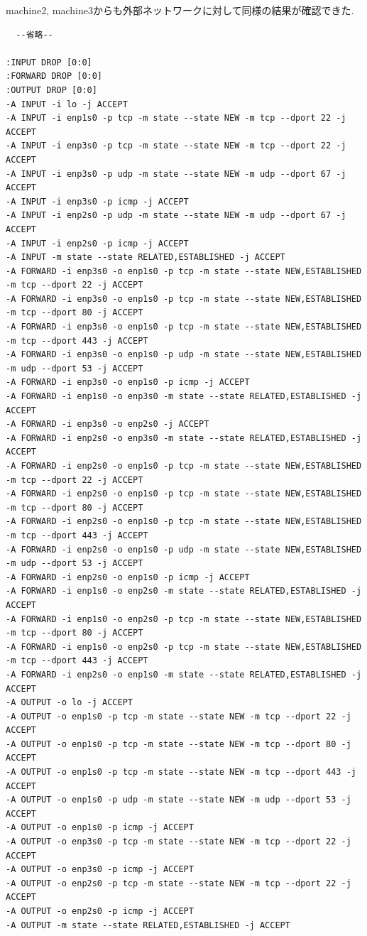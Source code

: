 \documentclass{ltjsarticle} %
\begin{document}
machine2, machine3からも外部ネットワークに対して同様の結果が確認できた. 

\begin{mdframed}
  \begin{verbatim}
  --省略--

:INPUT DROP [0:0]
:FORWARD DROP [0:0]
:OUTPUT DROP [0:0]
-A INPUT -i lo -j ACCEPT
-A INPUT -i enp1s0 -p tcp -m state --state NEW -m tcp --dport 22 -j ACCEPT
-A INPUT -i enp3s0 -p tcp -m state --state NEW -m tcp --dport 22 -j ACCEPT
-A INPUT -i enp3s0 -p udp -m state --state NEW -m udp --dport 67 -j ACCEPT
-A INPUT -i enp3s0 -p icmp -j ACCEPT
-A INPUT -i enp2s0 -p udp -m state --state NEW -m udp --dport 67 -j ACCEPT
-A INPUT -i enp2s0 -p icmp -j ACCEPT
-A INPUT -m state --state RELATED,ESTABLISHED -j ACCEPT
-A FORWARD -i enp3s0 -o enp1s0 -p tcp -m state --state NEW,ESTABLISHED -m tcp --dport 22 -j ACCEPT
-A FORWARD -i enp3s0 -o enp1s0 -p tcp -m state --state NEW,ESTABLISHED -m tcp --dport 80 -j ACCEPT
-A FORWARD -i enp3s0 -o enp1s0 -p tcp -m state --state NEW,ESTABLISHED -m tcp --dport 443 -j ACCEPT
-A FORWARD -i enp3s0 -o enp1s0 -p udp -m state --state NEW,ESTABLISHED -m udp --dport 53 -j ACCEPT
-A FORWARD -i enp3s0 -o enp1s0 -p icmp -j ACCEPT
-A FORWARD -i enp1s0 -o enp3s0 -m state --state RELATED,ESTABLISHED -j ACCEPT
-A FORWARD -i enp3s0 -o enp2s0 -j ACCEPT
-A FORWARD -i enp2s0 -o enp3s0 -m state --state RELATED,ESTABLISHED -j ACCEPT
-A FORWARD -i enp2s0 -o enp1s0 -p tcp -m state --state NEW,ESTABLISHED -m tcp --dport 22 -j ACCEPT
-A FORWARD -i enp2s0 -o enp1s0 -p tcp -m state --state NEW,ESTABLISHED -m tcp --dport 80 -j ACCEPT
-A FORWARD -i enp2s0 -o enp1s0 -p tcp -m state --state NEW,ESTABLISHED -m tcp --dport 443 -j ACCEPT
-A FORWARD -i enp2s0 -o enp1s0 -p udp -m state --state NEW,ESTABLISHED -m udp --dport 53 -j ACCEPT
-A FORWARD -i enp2s0 -o enp1s0 -p icmp -j ACCEPT
-A FORWARD -i enp1s0 -o enp2s0 -m state --state RELATED,ESTABLISHED -j ACCEPT
-A FORWARD -i enp1s0 -o enp2s0 -p tcp -m state --state NEW,ESTABLISHED -m tcp --dport 80 -j ACCEPT
-A FORWARD -i enp1s0 -o enp2s0 -p tcp -m state --state NEW,ESTABLISHED -m tcp --dport 443 -j ACCEPT
-A FORWARD -i enp2s0 -o enp1s0 -m state --state RELATED,ESTABLISHED -j ACCEPT
-A OUTPUT -o lo -j ACCEPT
-A OUTPUT -o enp1s0 -p tcp -m state --state NEW -m tcp --dport 22 -j ACCEPT
-A OUTPUT -o enp1s0 -p tcp -m state --state NEW -m tcp --dport 80 -j ACCEPT
-A OUTPUT -o enp1s0 -p tcp -m state --state NEW -m tcp --dport 443 -j ACCEPT
-A OUTPUT -o enp1s0 -p udp -m state --state NEW -m udp --dport 53 -j ACCEPT
-A OUTPUT -o enp1s0 -p icmp -j ACCEPT
-A OUTPUT -o enp3s0 -p tcp -m state --state NEW -m tcp --dport 22 -j ACCEPT
-A OUTPUT -o enp3s0 -p icmp -j ACCEPT
-A OUTPUT -o enp2s0 -p tcp -m state --state NEW -m tcp --dport 22 -j ACCEPT
-A OUTPUT -o enp2s0 -p icmp -j ACCEPT
-A OUTPUT -m state --state RELATED,ESTABLISHED -j ACCEPT
  

\end{verbatim}
\end{mdframed}
\end{document}
